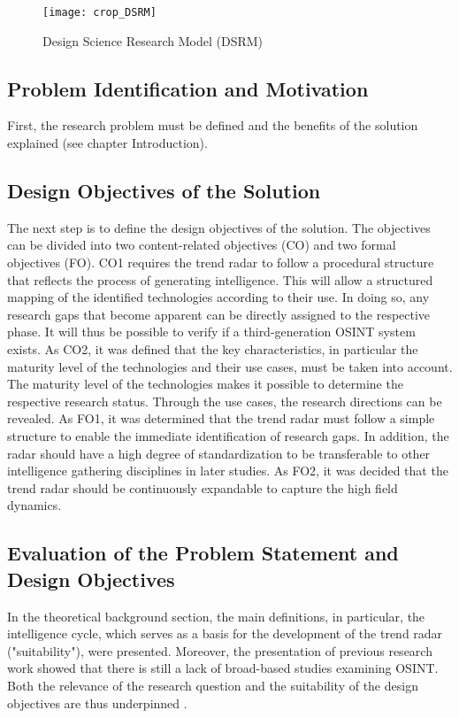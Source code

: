 \documentclass[10pt]{article}
\begin{document}
\begin{figure*}[thb]
    \centering
    \texttt{[image: crop\_DSRM]}
    \caption{Design Science Research Model (DSRM)}
    \label{fig: DSRM}
\end{figure*}

\subsection{Problem Identification and Motivation}

First, the research problem must be defined and the benefits of the solution explained (see chapter Introduction).

\subsection{Design Objectives of the Solution}

The next step is to define the design objectives of the solution. The
objectives can be divided into two content-related objectives (CO) and
two formal objectives (FO). CO1 requires the trend radar to follow a procedural
structure that reflects the process of generating intelligence. This will allow a structured mapping of the
identified technologies according to their use. In doing so, any
research gaps that become apparent can be directly assigned to the
respective phase. It will thus be possible to verify if a third-generation OSINT system exists. As CO2, it was defined that the key
characteristics, in particular the maturity level of the technologies
and their use cases, must be taken into account. The maturity level of
the technologies makes it possible to determine the respective research status.
Through the use cases, the research directions can be
revealed. As FO1, it was determined that the trend radar must follow
a simple structure to enable the immediate identification of research gaps. In addition,
the radar should have a high degree of standardization to be
transferable to other intelligence gathering disciplines in later
studies. As FO2, it was decided that the trend radar should be continuously expandable to capture the high field dynamics.

\subsection{Evaluation of the Problem Statement and Design Objectives}

In the theoretical background section, the main definitions, in
particular, the intelligence cycle, which serves as a basis for the
development of the trend radar ("suitability"), were presented. Moreover,
the presentation of previous research work showed that there
is still a lack of broad-based studies examining OSINT. Both the
relevance of the research question and the suitability of the
design objectives are thus underpinned \cite{Sonnenberg.2012}.
\end{document}
